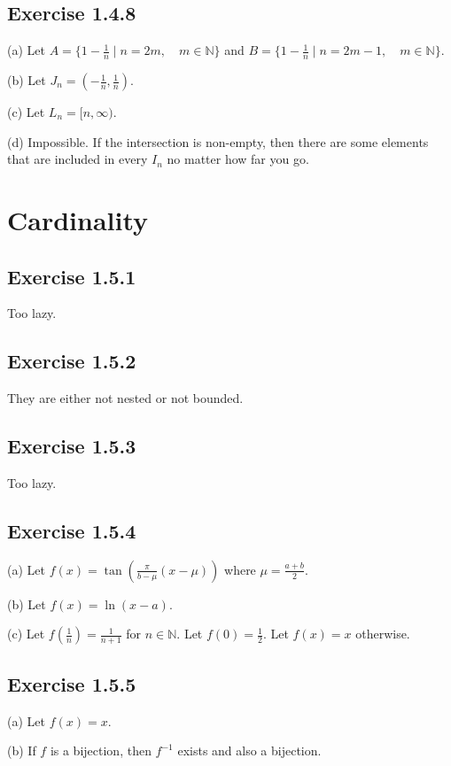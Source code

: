 \documentclass{book}
\begin{document}
\subsection*{Exercise 1.4.8}
(a)
Let $A = \{ 1 - \frac{1}{n} \mid n = 2m, \quad m \in \mathbb{N} \}$ and $B = \{ 1 - \frac{1}{n} \mid n = 2m - 1, \quad m \in \mathbb{N} \}$.

\noindent
(b)
Let $J_n = (-\frac{1}{n}, \frac{1}{n})$.

\noindent
(c)
Let $L_n = [n, \infty)$.

\noindent
(d)
Impossible. If the intersection is non-empty, then there are some elements that are included in every $I_n$ no matter how far you go.

\section{Cardinality}

\subsection*{Exercise 1.5.1}
Too lazy.

\subsection*{Exercise 1.5.2}
They are either not nested or not bounded.

\subsection*{Exercise 1.5.3}
Too lazy.

\subsection*{Exercise 1.5.4}
(a)
Let $f(x) = \tan\left(\frac{\pi}{b - \mu}(x - \mu)\right)$ where $\mu = \frac{a + b}{2}$.

\noindent
(b)
Let $f(x) = \ln(x - a)$.

\noindent
(c)
Let $f\left(\frac{1}{n}\right) = \frac{1}{n + 1}$ for $n \in \mathbb{N}$. Let $f(0) = \frac{1}{2}$. Let $f(x) = x$ otherwise.

\subsection*{Exercise 1.5.5}
(a)
Let $f(x) = x$.

\noindent
(b)
If $f$ is a bijection, then $f^{-1}$ exists and also a bijection.
\end{document}
